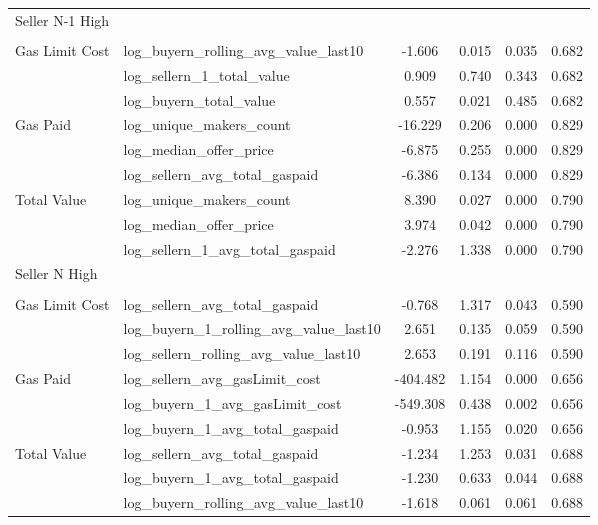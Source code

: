 \begin{table}
\begin{tabular}{llcccc}
Seller N-1 High &  &  &  &  & \\
 &  &  &  &  & \\
Gas Limit Cost & log\_buyern\_rolling\_avg\_value\_last10 & -1.606 & 0.015 & 0.035 & 0.682\\
 & log\_sellern\_1\_total\_value & 0.909 & 0.740 & 0.343 & 0.682\\
 & log\_buyern\_total\_value & 0.557 & 0.021 & 0.485 & 0.682\\
Gas Paid & log\_unique\_makers\_count & -16.229 & 0.206 & 0.000 & 0.829\\
 & log\_median\_offer\_price & -6.875 & 0.255 & 0.000 & 0.829\\
 & log\_sellern\_avg\_total\_gaspaid & -6.386 & 0.134 & 0.000 & 0.829\\
Total Value & log\_unique\_makers\_count & 8.390 & 0.027 & 0.000 & 0.790\\
 & log\_median\_offer\_price & 3.974 & 0.042 & 0.000 & 0.790\\
 & log\_sellern\_1\_avg\_total\_gaspaid & -2.276 & 1.338 & 0.000 & 0.790\\
Seller N High &  &  &  &  & \\
 &  &  &  &  & \\
Gas Limit Cost & log\_sellern\_avg\_total\_gaspaid & -0.768 & 1.317 & 0.043 & 0.590\\
 & log\_buyern\_1\_rolling\_avg\_value\_last10 & 2.651 & 0.135 & 0.059 & 0.590\\
 & log\_sellern\_rolling\_avg\_value\_last10 & 2.653 & 0.191 & 0.116 & 0.590\\
Gas Paid & log\_sellern\_avg\_gasLimit\_cost & -404.482 & 1.154 & 0.000 & 0.656\\
 & log\_buyern\_1\_avg\_gasLimit\_cost & -549.308 & 0.438 & 0.002 & 0.656\\
 & log\_buyern\_1\_avg\_total\_gaspaid & -0.953 & 1.155 & 0.020 & 0.656\\
Total Value & log\_sellern\_avg\_total\_gaspaid & -1.234 & 1.253 & 0.031 & 0.688\\
 & log\_buyern\_1\_avg\_total\_gaspaid & -1.230 & 0.633 & 0.044 & 0.688\\
 & log\_buyern\_rolling\_avg\_value\_last10 & -1.618 & 0.061 & 0.061 & 0.688\\
\bottomrule
\end{tabular}
\end{table}
